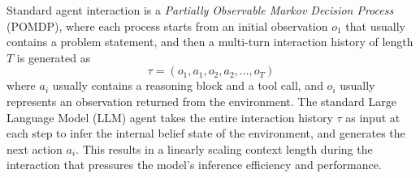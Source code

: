 Standard agent interaction is a \emph{Partially Observable Markov Decision Process} (POMDP), where each process starts from an initial observation $o_1$ that usually contains a problem statement, and then a multi-turn interaction history of length $T$ is generated as
\begin{equation*}
    \tau = (o_1,a_1,o_2,a_2,\ldots,o_T)
\end{equation*}
where $a_i$ usually contains a reasoning block and a tool call, and $o_i$ usually represents an observation returned from the environment.
The standard Large Language Model (LLM) agent takes the entire interaction history $\tau$ as input at each step to infer the internal belief state of the environment, and generates the next action $a_i$. This results in a linearly scaling context length during the interaction that pressures the model's inference efficiency and performance.